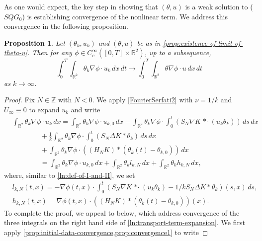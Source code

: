 \documentclass[11pt,reqno,xcolor=svgnames]{amsart}
\def\R{{\mathbb R}}
\def\Z{{\mathbb Z}}
\theoremstyle{plain}
\newtheorem{prop}[theorem]{Proposition}
\theoremstyle{definition}
\theoremstyle{plain}
\theoremstyle{remark}
\newcommand{\stardot}{{\mathop{* \cdot}}}
\begin{document}
 As one would expect, the key step in showing that $(\theta,u)$ is a weak solution to ($SQG_0$) is establishing convergence of the nonlinear term. We address this convergence in the following proposition.
\begin{prop}\label{prop:nonlinear-term-convergence}
Let $(\theta_k, u_k)$ and $(\theta,u)$ be as in \cref{prop:existence-of-limit-of-theta-u}.  Then for any $\phi\in C^{\infty}_c([0,T]\times\R^2)$, up to a subsequence, 
\begin{equation}\label{nonlinearterm}
\int_0^T\int_{\R^2} \theta_k\nabla\phi\cdot u_k \, dx \, dt \rightarrow \int_0^T\int_{\R^2} \theta\nabla\phi \cdot u \, dx\, dt
\end{equation} 
as $k\rightarrow\infty$.
\end{prop}
\begin{proof}
Fix $N\in\Z$ with $N<0$.  We apply \cref{FourierSerfati2} with $\nu=1/k$ and $U_{\infty}\equiv 0$ to expand $u_k$ and write
\begin{equation} \label{ln:transport-term-expansion}
\begin{split}
&\int_{\R^2}\theta_k \nabla\phi\cdot  u_k \, dx =  \int_{\R^2} \theta_k\nabla\phi\cdot u_{k,0} \, dx - \int_{\R^2}\theta_k\nabla\phi\cdot\int_0^t (S_{N}\nabla K  \stardot(u_k\theta_k))  \, ds \, dx\\
&\qquad\qquad + \frac{1}{k}\int_{\R^2}\theta_k\nabla\phi\cdot\int_0^t (S_{N}\Delta K \ast \theta_k)  \, ds \, dx \\
&\qquad\qquad + \int_{\R^2}\theta_k\nabla\phi\cdot((H_{N}K) \ast (\theta_k(t) - \theta_{k,0})) \, dx\\
&\qquad\qquad=  \int_{\R^2} \theta_k\nabla\phi\cdot u_{k,0} \, dx+ \int_{\R^2} \theta_kl_{k,N} \, dx + \int_{\R^2} \theta_kh_{k,N} \, dx,
\end{split}
\end{equation} 
where, similar to \eqref{ln:def-of-I-and-II}, we set
\begin{equation} \label{ln:def-of-I-k-II-k}
\begin{split}
&l_{k,N}(t,x) = -\nabla\phi(t,x)\cdot\int_0^t \left( S_{N}\nabla K \stardot(u_k\theta_k) - 1/k S_{N}\Delta K \ast \theta_k\right)(s,x) \, ds,\\
&h_{k,N}(t, x) =  \nabla\phi(t,x)\cdot((H_{N}K) \ast (\theta_k(t) - \theta_{k,0}))(x).
\end{split}
\end{equation}
To complete the proof, we appeal to  below, which address convergence of the three integrals on the right hand side of \eqref{ln:transport-term-expansion}.  We first apply \cref{prop:initial-data-convergence,prop:convergence1} to write

\end{proof}
\end{document}
